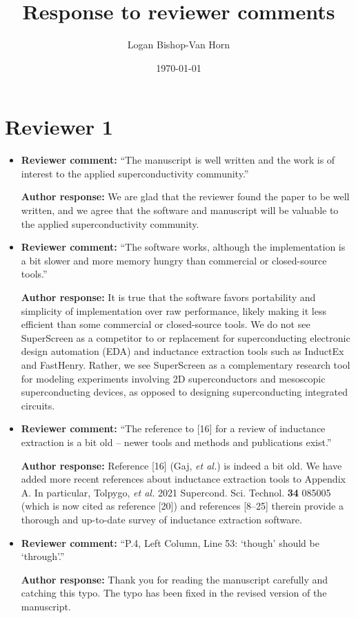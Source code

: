 \documentclass{article} %
\title{Response to reviewer comments}
\author{Logan Bishop-Van Horn}
\date{\today}
\begin{document}
\maketitle

\section{Reviewer 1}

\begin{itemize}
    \item{
    {\bf Reviewer comment:} ``The manuscript is well written and the work is of interest to the applied superconductivity community.''
    
    {\bf Author response:} We are glad that the reviewer found the paper to be well written, and we agree that the software and manuscript will be valuable to the applied superconductivity community.
    }
    \item{
    {\bf Reviewer comment:} ``The software works, although the implementation is a bit slower and more memory hungry than commercial or closed-source tools.''
    
    {\bf Author response:} It is true that the software favors portability and simplicity of implementation over raw performance, likely making it less efficient than some commercial or closed-source tools. We do not see SuperScreen as a competitor to or replacement for superconducting electronic design automation (EDA) and inductance extraction tools such as InductEx and FastHenry. Rather, we see SuperScreen as a complementary research tool for modeling experiments involving 2D superconductors and mesoscopic superconducting devices, as opposed to designing superconducting integrated circuits. 
    }
    \item{
    {\bf Reviewer comment:} ``The reference to [16] for a review of inductance extraction is a bit old -- newer tools and methods and publications exist.''
    
    {\bf Author response:} Reference [16] (Gaj, \emph{et al.}) is indeed a bit old. We have added more recent references about inductance extraction tools to Appendix A. In particular, Tolpygo, \emph{et al.} 2021 Supercond. Sci. Technol. {\bf 34} 085005 (which is now cited as reference [20]) and references [8--25] therein provide a thorough and up-to-date survey of inductance extraction software.
    }
    \item{
    {\bf Reviewer comment:} ``P.4, Left Column, Line 53: `though' should be `through'.''
    
    {\bf Author response:} Thank you for reading the manuscript carefully and catching this typo. The typo has been fixed in the revised version of the manuscript.
    }
\end{itemize}
\end{document}
